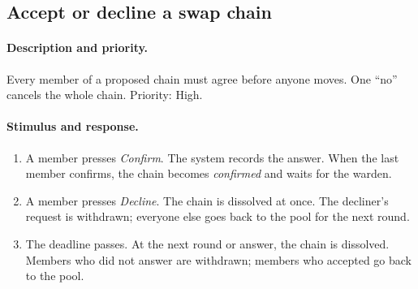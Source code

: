 \documentclass[11pt,a4paper,parskip=half,toc=listof]{scrreprt}
\begin{document}
\subsection{Accept or decline a swap chain}

\paragraph{Description and priority.} Every member of a proposed chain
must agree before anyone moves. One ``no'' cancels the whole chain.
Priority: High.

\paragraph{Stimulus and response.}
\begin{enumerate}
  \item A member presses \emph{Confirm}. The system records the answer.
    When the last member confirms, the chain becomes \emph{confirmed} and
    waits for the warden.
  \item A member presses \emph{Decline}. The chain is dissolved at once.
    The decliner's request is withdrawn; everyone else goes back to the
    pool for the next round.
  \item The deadline passes. At the next round or answer, the chain is
    dissolved. Members who did not answer are withdrawn; members who
    accepted go back to the pool.
\end{enumerate}
\end{document}
